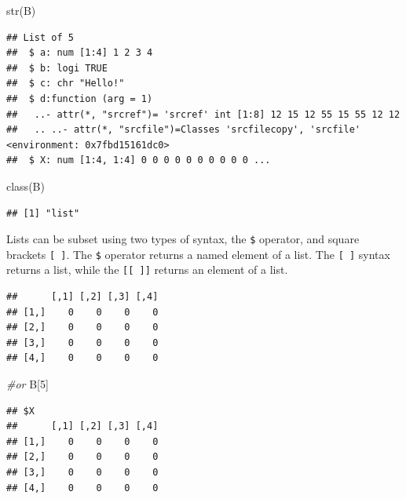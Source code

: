 \documentclass[
]{book}
\newenvironment{Shaded}{\begin{snugshade}}{\end{snugshade}}
\newcommand{\CommentTok}[1]{\textcolor[rgb]{0.56,0.35,0.01}{\textit{#1}}}
\newcommand{\DecValTok}[1]{\textcolor[rgb]{0.00,0.00,0.81}{#1}}
\newcommand{\FunctionTok}[1]{\textcolor[rgb]{0.00,0.00,0.00}{#1}}
\newcommand{\NormalTok}[1]{#1}
\newcommand{\SpecialCharTok}[1]{\textcolor[rgb]{0.00,0.00,0.00}{#1}}
\begin{document}
\begin{Shaded}
\begin{Highlighting}[]
\FunctionTok{str}\NormalTok{(B)}
\end{Highlighting}
\end{Shaded}

\begin{verbatim}
## List of 5
##  $ a: num [1:4] 1 2 3 4
##  $ b: logi TRUE
##  $ c: chr "Hello!"
##  $ d:function (arg = 1)  
##   ..- attr(*, "srcref")= 'srcref' int [1:8] 12 15 12 55 15 55 12 12
##   .. ..- attr(*, "srcfile")=Classes 'srcfilecopy', 'srcfile' <environment: 0x7fbd15161dc0> 
##  $ X: num [1:4, 1:4] 0 0 0 0 0 0 0 0 0 0 ...
\end{verbatim}

\begin{Shaded}
\begin{Highlighting}[]
\FunctionTok{class}\NormalTok{(B)}
\end{Highlighting}
\end{Shaded}

\begin{verbatim}
## [1] "list"
\end{verbatim}

Lists can be subset using two types of syntax, the \texttt{\$} operator, and square brackets \texttt{{[}\ {]}}. The \texttt{\$} operator returns a named element of a list. The \texttt{{[}\ {]}} syntax returns a list, while the \texttt{{[}{[}\ {]}{]}} returns an element of a list.

\begin{Shaded}
\end{Shaded}

\begin{verbatim}
##      [,1] [,2] [,3] [,4]
## [1,]    0    0    0    0
## [2,]    0    0    0    0
## [3,]    0    0    0    0
## [4,]    0    0    0    0
\end{verbatim}

\begin{Shaded}
\begin{Highlighting}[]
\CommentTok{\#or}
\NormalTok{B[}\DecValTok{5}\NormalTok{]}
\end{Highlighting}
\end{Shaded}

\begin{verbatim}
## $X
##      [,1] [,2] [,3] [,4]
## [1,]    0    0    0    0
## [2,]    0    0    0    0
## [3,]    0    0    0    0
## [4,]    0    0    0    0
\end{verbatim}
\end{document}
